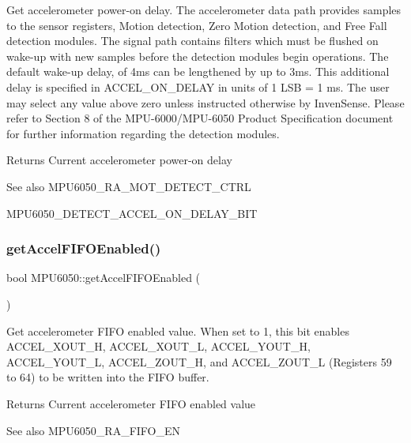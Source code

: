 Get accelerometer power-\/on delay. The accelerometer data path provides samples to the sensor registers, Motion detection, Zero Motion detection, and Free Fall detection modules. The signal path contains filters which must be flushed on wake-\/up with new samples before the detection modules begin operations. The default wake-\/up delay, of 4ms can be lengthened by up to 3ms. This additional delay is specified in A\+C\+C\+E\+L\+\_\+\+O\+N\+\_\+\+D\+E\+L\+AY in units of 1 L\+SB = 1 ms. The user may select any value above zero unless instructed otherwise by Inven\+Sense. Please refer to Section 8 of the M\+P\+U-\/6000/\+M\+P\+U-\/6050 Product Specification document for further information regarding the detection modules. \begin{DoxyReturn}{Returns}
Current accelerometer power-\/on delay 
\end{DoxyReturn}
\begin{DoxySeeAlso}{See also}
M\+P\+U6050\+\_\+\+R\+A\+\_\+\+M\+O\+T\+\_\+\+D\+E\+T\+E\+C\+T\+\_\+\+C\+T\+RL 

M\+P\+U6050\+\_\+\+D\+E\+T\+E\+C\+T\+\_\+\+A\+C\+C\+E\+L\+\_\+\+O\+N\+\_\+\+D\+E\+L\+A\+Y\+\_\+\+B\+IT 
\end{DoxySeeAlso}
\mbox{\label{class_m_p_u6050_ace244415128ad7a38293ad6808b7face}} 
\subsubsection{\texorpdfstring{getAccelFIFOEnabled()}{getAccelFIFOEnabled()}}
{\footnotesize\ttfamily bool M\+P\+U6050\+::get\+Accel\+F\+I\+F\+O\+Enabled (\begin{DoxyParamCaption}{ }\end{DoxyParamCaption})}

Get accelerometer F\+I\+FO enabled value. When set to 1, this bit enables A\+C\+C\+E\+L\+\_\+\+X\+O\+U\+T\+\_\+H, A\+C\+C\+E\+L\+\_\+\+X\+O\+U\+T\+\_\+L, A\+C\+C\+E\+L\+\_\+\+Y\+O\+U\+T\+\_\+H, A\+C\+C\+E\+L\+\_\+\+Y\+O\+U\+T\+\_\+L, A\+C\+C\+E\+L\+\_\+\+Z\+O\+U\+T\+\_\+H, and A\+C\+C\+E\+L\+\_\+\+Z\+O\+U\+T\+\_\+L (Registers 59 to 64) to be written into the F\+I\+FO buffer. \begin{DoxyReturn}{Returns}
Current accelerometer F\+I\+FO enabled value 
\end{DoxyReturn}
\begin{DoxySeeAlso}{See also}
M\+P\+U6050\+\_\+\+R\+A\+\_\+\+F\+I\+F\+O\+\_\+\+EN 
\end{DoxySeeAlso}
\mbox{\label{class_m_p_u6050_a8fc7eab1302281f6e4bc953379f3237b}} 
